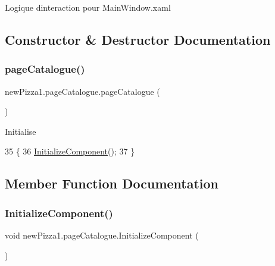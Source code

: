 Logique d\textquotesingle{}interaction pour Main\+Window.\+xaml 

\subsection{Constructor \& Destructor Documentation}
\mbox{\label{classnewPizza1_1_1pageCatalogue_a8fca5ae0a3d451a6c8759d1384751a6f}} 
\subsubsection{\texorpdfstring{page\+Catalogue()}{pageCatalogue()}}
{\footnotesize\ttfamily new\+Pizza1.\+page\+Catalogue.\+page\+Catalogue (\begin{DoxyParamCaption}{ }\end{DoxyParamCaption})\hspace{0.3cm}{\ttfamily [inline]}}



Initialise 


\begin{DoxyCode}
35         \{
36             \hyperlink{classnewPizza1_1_1pageCatalogue_a43a8ad0ab6df5f89084c072525b49383}{InitializeComponent}();
37         \}
\end{DoxyCode}


\subsection{Member Function Documentation}
\mbox{\label{classnewPizza1_1_1pageCatalogue_a43a8ad0ab6df5f89084c072525b49383}} 
\subsubsection{\texorpdfstring{Initialize\+Component()}{InitializeComponent()}\hspace{0.1cm}{\footnotesize\ttfamily [1/3]}}
{\footnotesize\ttfamily void new\+Pizza1.\+page\+Catalogue.\+Initialize\+Component (\begin{DoxyParamCaption}{ }\end{DoxyParamCaption})\hspace{0.3cm}{\ttfamily [inline]}}



